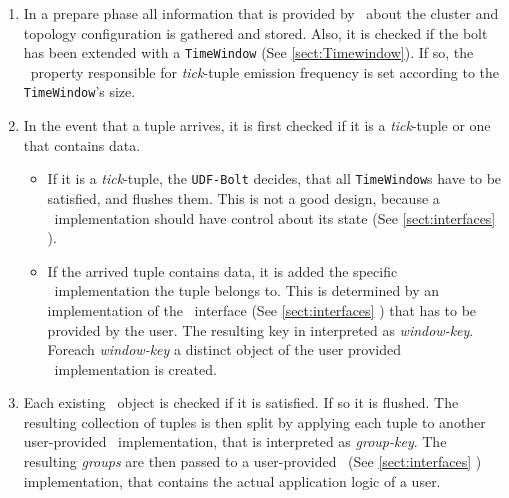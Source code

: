 \begin{enumerate}
	\item In a prepare phase all information that is provided by \storm\ about the cluster and topology configuration is gathered and stored. Also, it is checked if the bolt has been extended with a \texttt{TimeWindow} (See \ref{sect:Timewindow}). If so, the \storm\ property responsible for \textsl{tick}-tuple emission frequency is set according to the \texttt{TimeWindow}'s size.
	
	\item
		In the event that a tuple arrives, it is first checked if it is a \textsl{tick}-tuple or one that contains data. 
		\begin{itemize} 
			\item
				If it is a \textsl{tick}-tuple, the \texttt{UDF-Bolt} decides, that all \texttt{TimeWindow}s have  to be satisfied, and flushes them. This is not a good design, because a \iwindow\ implementation should have control about its state (See \ref{sect:interfaces} \iwindow).
			\item
				If the arrived tuple contains data, it is added the specific \iwindow\ implementation the tuple belongs to. This is determined by an implementation of the \ikeyconfig\ interface (See \ref{sect:interfaces} \ikeyconfig) that has to be provided by the user. The resulting key in interpreted as \textsl{window-key}. Foreach \textsl{window-key} a distinct object of the user provided \iwindow\ implementation is created.
		\end{itemize}
	\item
		Each existing \iwindow\ object is checked if it is satisfied. If so it is flushed. The resulting collection of tuples is then split by applying each tuple to another user-provided \ikeyconfig\ implementation, that is interpreted as \textsl{group-key}. The resulting \textsl{groups} are then passed to a user-provided \ioperator\ (See \ref{sect:interfaces} \ioperator) implementation, that contains the actual application logic of a user.
\end{enumerate}

